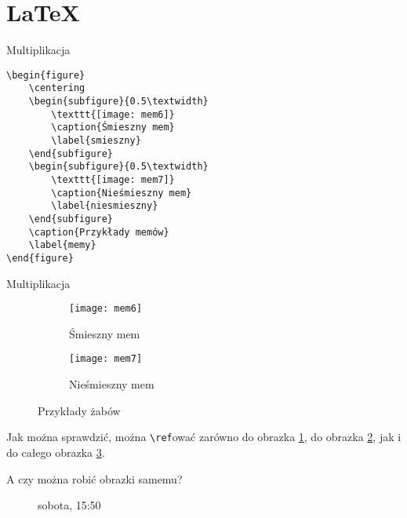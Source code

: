 \documentclass{beamer}
\newcommand{\tb}{\textbackslash}
\begin{document}
\section{\LaTeX}

\begin{frame}[fragile]{Multiplikacja}{}
    \begin{verbatim}
\begin{figure}
    \centering
    \begin{subfigure}{0.5\textwidth}
        \texttt{[image: mem6]}
        \caption{Śmieszny mem}
        \label{smieszny}
    \end{subfigure}
    \begin{subfigure}{0.5\textwidth}
        \texttt{[image: mem7]}
        \caption{Nieśmieszny mem}
        \label{niesmieszny}
    \end{subfigure}
    \caption{Przykłady memów}
    \label{memy}
\end{figure}
    \end{verbatim}
\end{frame}


\begin{frame}[fragile]{Multiplikacja}{}
\begin{figure}
    \centering
    \begin{subfigure}[c]{0.45\textwidth}
        \texttt{[image: mem6]}
        \caption{Śmieszny mem}
        \label{smieszny}
    \end{subfigure}
    \begin{subfigure}[c]{0.45\textwidth}
        \texttt{[image: mem7]}
        \caption{Nieśmieszny mem}
        \label{niesmieszny}
    \end{subfigure}
    \caption{Przykłady żabów}
    \label{memy}
\end{figure}

Jak można sprawdzić, można \texttt{\tb{ref}}ować zarówno do obrazka \ref{smieszny}, do obrazka \ref{niesmieszny}, jak i do całego obrazka \ref{memy}.

\end{frame}

\begin{frame}{A czy można robić obrazki samemu?}{}
    \pause
    \begin{figure}
    \caption{sobota, 15:50}
    \end{figure}
    
\end{frame}
\end{document}
